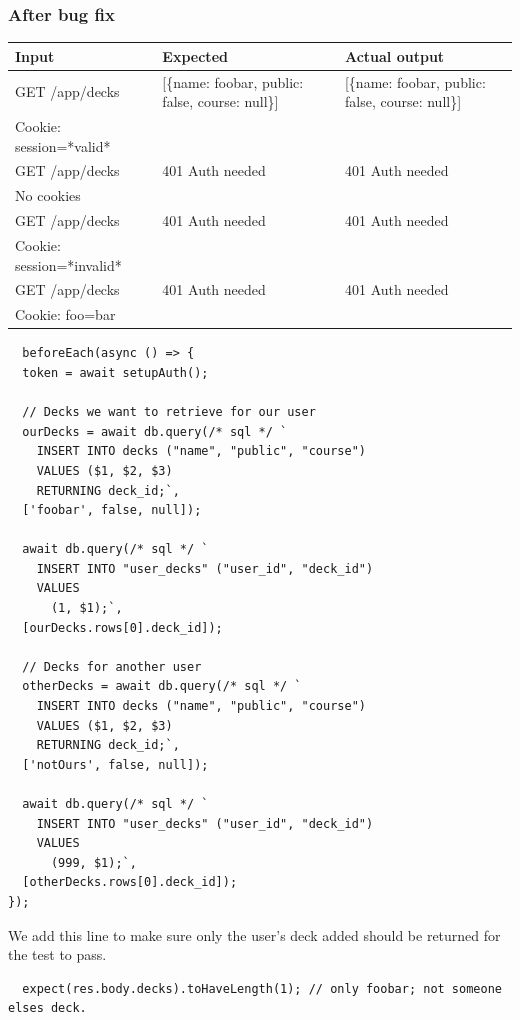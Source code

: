 \documentclass{report}
\begin{document}
\subsubsection{After bug fix}
\begin{tabular}{|l|p{4cm}|p{4cm}|}
  \cline{1-3}
  Input & Expected & Actual output \\
  \hline \hline
  GET /app/decks & [\{name: foobar, public: false, course: null\}] & [\{name: foobar, public: false, course: null\}]  \\
  Cookie: session=*valid* && \\
  \hline \hline
  GET /app/decks & 401 Auth needed & 401 Auth needed \\
  No cookies && \\
  \hline \hline
  GET /app/decks & 401 Auth needed & 401 Auth needed \\
  Cookie: session=*invalid* && \\
  \hline \hline
  GET /app/decks & 401 Auth needed & 401 Auth needed \\
  Cookie: foo=bar && \\
  \hline
\end{tabular}

\begin{verbatim}
  beforeEach(async () => {
  token = await setupAuth();

  // Decks we want to retrieve for our user
  ourDecks = await db.query(/* sql */ `
    INSERT INTO decks ("name", "public", "course")
    VALUES ($1, $2, $3)
    RETURNING deck_id;`,
  ['foobar', false, null]);

  await db.query(/* sql */ `
    INSERT INTO "user_decks" ("user_id", "deck_id")
    VALUES 
      (1, $1);`,
  [ourDecks.rows[0].deck_id]);

  // Decks for another user
  otherDecks = await db.query(/* sql */ `
    INSERT INTO decks ("name", "public", "course")
    VALUES ($1, $2, $3)
    RETURNING deck_id;`,
  ['notOurs', false, null]);

  await db.query(/* sql */ `
    INSERT INTO "user_decks" ("user_id", "deck_id")
    VALUES 
      (999, $1);`,
  [otherDecks.rows[0].deck_id]);
});

\end{verbatim}
We add this line to make sure only the user's deck added should be returned for the test to pass.
\begin{verbatim}
  expect(res.body.decks).toHaveLength(1); // only foobar; not someone elses deck.
\end{verbatim}
\end{document}
